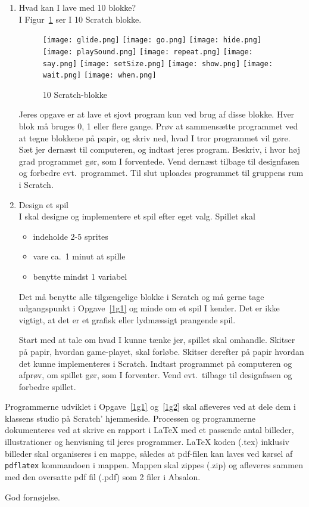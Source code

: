 \documentclass[a4paper,12pt]{article}
\begin{document}
\begin{enumerate}[label=1g.\arabic*,start=0]
\item \label{1g1} Hvad kan I lave med 10 blokke?\\
  I Figur~\ref{fig:blokke} ser I 10 Scratch blokke.
  \begin{figure}
    \centering
    \texttt{[image: glide.png]}
    \texttt{[image: go.png]}
    \texttt{[image: hide.png]}
    \texttt{[image: playSound.png]}
    \texttt{[image: repeat.png]}
    \texttt{[image: say.png]}
    \texttt{[image: setSize.png]}
    \texttt{[image: show.png]}
    \texttt{[image: wait.png]}
    \texttt{[image: when.png]}
    \caption{10 Scratch-blokke}
    \label{fig:blokke}
  \end{figure}
  Jeres opgave er at lave et sjovt program kun ved brug af disse blokke. Hver blok må bruges 0, 1 eller flere gange. Prøv at sammensætte programmet ved at tegne blokkene på papir, og skriv ned, hvad I tror programmet vil gøre. Sæt jer dernæst til computeren, og indtast jeres program. Beskriv, i hvor høj grad programmet gør, som I forventede. Vend dernæst tilbage til designfasen og forbedre evt.\ programmet. Til slut uploades programmet til gruppens rum i Scratch.
\item \label{1g2} Design et spil\\
  I skal designe og implementere et spil efter eget valg. Spillet skal
  \begin{itemize}
  \item indeholde 2-5 sprites 
  \item vare ca.\ 1 minut at spille 
  \item benytte mindst 1 variabel
  \end{itemize}
  Det må benytte alle tilgængelige blokke i Scratch og må gerne tage udgangspunkt i Opgave~\ref{1g1} og minde om et spil I kender. Det er ikke vigtigt, at det er et grafisk eller lydmæssigt prangende spil.

  Start med at tale om hvad I kunne tænke jer, spillet skal omhandle. Skitser på papir, hvordan game-playet, skal forløbe. Skitser derefter på papir hvordan det kunne implementeres i Scratch. Indtast programmet på computeren og afprøv, om spillet gør, som I forventer. Vend evt.\ tilbage til designfasen og forbedre spillet.
\end{enumerate}
Programmerne udviklet i Opgave~\ref{1g1} og~\ref{1g2} skal afleveres ved at dele dem i klassens studio på Scratch' hjemmeside. Processen og programmerne dokumenteres ved at skrive en rapport i LaTeX med et passende antal billeder, illustrationer og henvisning til jeres programmer. LaTeX koden (.tex) inklusiv billeder skal organiseres i en mappe, således at pdf-filen kan laves ved kørsel af \verb|pdflatex| kommandoen i mappen. Mappen skal zippes (.zip) og afleveres sammen med den oversatte pdf fil (.pdf) som 2 filer i Absalon.

\flushright God fornøjelse.
\end{document}
